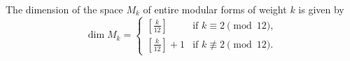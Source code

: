 The dimension of the space $M_k$ of entire modular forms of weight $k$ is given by
$$
\dim M_k = \begin{cases}
\left[ \frac{k}{12} \right] & \text{if } k \equiv 2 \pmod{12}, \\[6pt]
\left[ \frac{k}{12} \right] + 1 & \text{if } k \not\equiv 2 \pmod{12}.
\end{cases}
$$
